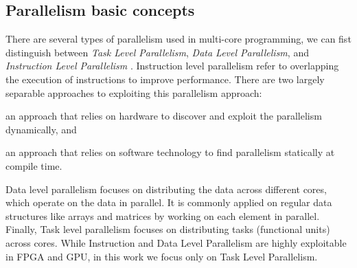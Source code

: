 
\subsection{Parallelism basic concepts}
There are several types of parallelism used in multi-core programming, we can fist distinguish between \emph{Task Level Parallelism}, \emph{Data Level Parallelism}, and \emph{Instruction Level Parallelism} \cite{computerarchitecture}. Instruction level parallelism refer to overlapping the execution of instructions to improve performance. There are two largely separable approaches to exploiting this parallelism approach: \begin{enumerate*} \item an approach that relies on hardware to discover and exploit the parallelism dynamically, and \item an approach that relies on software technology to find parallelism statically at compile time.\end{enumerate*} Data level parallelism focuses on distributing the data across different cores, which operate on the data in parallel. It is commonly applied on regular data structures like arrays and matrices by working on each element in parallel. Finally, Task level parallelism focuses on distributing tasks (functional units) across cores. While Instruction and Data Level Parallelism are highly exploitable in FPGA and GPU, in this work we focus only on Task Level Parallelism.
